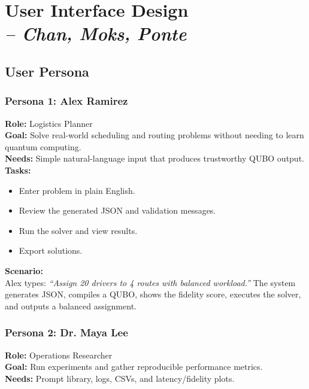 \chapter{User Interface Design \\
\small{\textit{-- Chan, Moks, Ponte}}}
\label{Chapter::UserInterfaceDesign}

\section{User Persona}

\subsection{Persona 1: Alex Ramirez}

\textbf{Role:} Logistics Planner \\[2mm]
\textbf{Goal:} Solve real-world scheduling and routing problems without needing to learn quantum computing. \\[2mm]
\textbf{Needs:} Simple natural-language input that produces trustworthy QUBO output. \\[4mm]

\textbf{Tasks:}
\begin{itemize}
    \item Enter problem in plain English.
    \item Review the generated JSON and validation messages.
    \item Run the solver and view results.
    \item Export solutions.
\end{itemize}

\textbf{Scenario:} \\
Alex types: \textit{“Assign 20 drivers to 4 routes with balanced workload.”}  
The system generates JSON, compiles a QUBO, shows the fidelity score, executes the solver, and outputs a balanced assignment.

\bigskip

\subsection{Persona 2: Dr. Maya Lee}

\textbf{Role:} Operations Researcher \\[2mm]
\textbf{Goal:} Run experiments and gather reproducible performance metrics. \\[2mm]
\textbf{Needs:} Prompt library, logs, CSVs, and latency/fidelity plots. \\[4mm]

